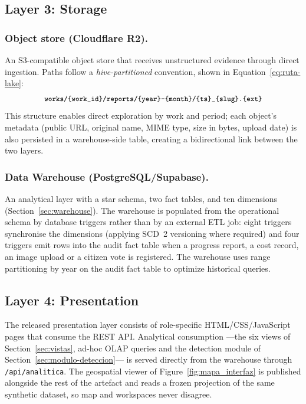 \documentclass[runningheads]{llncs}
\renewcommand{\_}{\origunderscore\allowbreak}
\begin{document}
\subsection{Layer 3: Storage}
\label{sec:l3}

\subsubsection{Object store (Cloudflare R2).}
An S3-compatible object store that receives unstructured evidence through direct ingestion. Paths follow a \textit{hive-partitioned} convention, shown in Equation~\eqref{eq:ruta-lake}:
\begin{equation}
\small\texttt{works/\{work\_id\}/reports/\{year\}-\{month\}/\{ts\}\_\{slug\}.\{ext\}}
\label{eq:ruta-lake}
\end{equation}
This structure enables direct exploration by work and period; each object's metadata (public URL, original name, MIME type, size in bytes, upload date) is also persisted in a warehouse-side table, creating a bidirectional link between the two layers.

\subsubsection{Data Warehouse (PostgreSQL/Supabase).}
An analytical layer with a star schema, two fact tables, and ten dimensions (Section~\ref{sec:warehouse}). The warehouse is populated from the operational schema by database triggers rather than by an external ETL job: eight triggers synchronise the dimensions (applying SCD~2 versioning where required) and four triggers emit rows into the audit fact table when a progress report, a cost record, an image upload or a citizen vote is registered. The warehouse uses range partitioning by year on the audit fact table to optimize historical queries.

\subsection{Layer 4: Presentation}
\label{sec:l4}
The released presentation layer consists of role-specific HTML/CSS/JavaScript pages that consume the REST API. Analytical consumption ---the six views of Section~\ref{sec:vistas}, ad-hoc OLAP queries and the detection module of Section~\ref{sec:modulo-deteccion}--- is served directly from the warehouse through \texttt{/api/analitica}. The geospatial viewer of Figure~\ref{fig:mapa_interfaz} is published alongside the rest of the artefact and reads a frozen projection of the same synthetic dataset, so map and workspaces never disagree.
\end{document}
